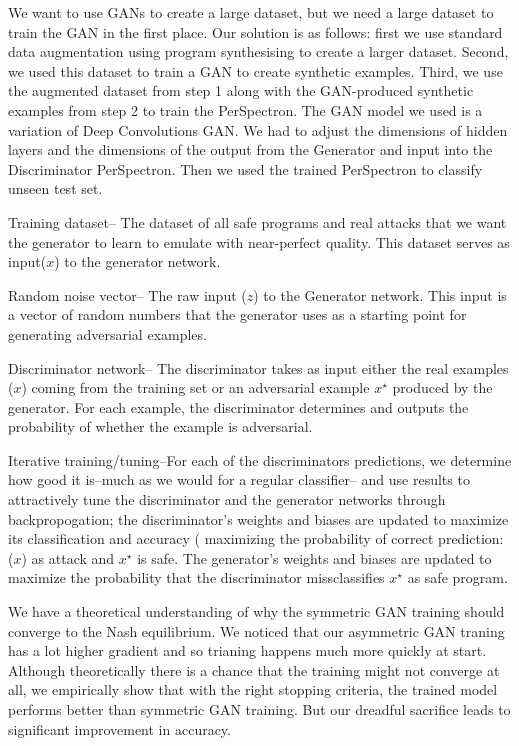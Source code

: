 We want to use GANs to create a large dataset, but we need a large dataset to train the GAN in the first place. 
Our solution is as follows:
first we use standard data augmentation using program synthesising to create a larger dataset. Second, we used this dataset to train a GAN to create synthetic examples. Third, we use the augmented dataset from step 1 along with the GAN-produced synthetic examples from step 2 to train the PerSpectron. The GAN model we used is a variation of Deep Convolutions GAN. We had to adjust the dimensions of hidden layers and the dimensions of the output from the Generator and input into the Discriminator PerSpectron. Then we used the trained PerSpectron to classify unseen test set.  

Training dataset-- The dataset of all safe programs and real attacks that we want the generator to learn to emulate with near-perfect quality. This dataset serves as input($x$) to the generator network. 

Random noise vector-- The raw input ($z$) to the Generator network. This input is a vector of random numbers that the generator uses as a starting point for generating adversarial examples. 

Discriminator network-- The discriminator takes as input either the real examples ($x$) coming from the training set or an adversarial example $x^{\star}$ produced by the generator. For each example, the discriminator determines and outputs the probability of whether the example is adversarial.

Iterative training/tuning--For each of the discriminators predictions, we determine how good it is--much as we would for a regular classifier-- and use results to attractively tune the discriminator and the generator networks through backpropogation; the discriminator's weights and biases are updated to maximize its classification and accuracy ( maximizing the probability of correct prediction: ($x$) as attack and $x^{\star}$ is safe. 
The generator's weights and biases are updated to maximize the probability that the discriminator missclassifies $x^{\star}$ as safe program. 


We have a theoretical understanding of why the symmetric GAN training should converge to the Nash equilibrium. We noticed that our asymmetric GAN traning has a lot higher gradient and so trianing happens much more quickly at start. Although theoretically there is a chance that the training might not converge at all, we empirically show that with the right stopping criteria, the trained model performs better than symmetric GAN training. 
But our dreadful sacrifice leads to significant improvement in accuracy.


